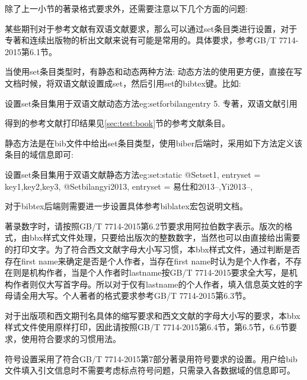 \documentclass[11pt]{article} %
\begin{document}
除了上一小节的著录格式要求外，还需要注意以下几个方面的问题:

\begin{property}{}{}
某些期刊对于参考文献有双语文献要求，那么可以通过set条目类进行设置，对于专著和连续出版物的析出文献来说有可能是常用的。具体要求，参考GB/T 7714-2015第6.1节。
\end{property}

当使用set条目类型时，有静态和动态两种方法:
动态方法的使用更方便，直接在写文档时候，将双语文献设置成set，然后引用set的bibtex键。比如:
\begin{codetex}{设置set条目集用于双语文献动态方法}{eg:setforbilangentry}
5. 专著，双语文献引用\cite{bilangyi2013}
\end{codetex}

得到的参考文献打印结果见\ref{sec:test:book}节的参考文献条目。

静态方法是在bib文件中给出set条目类型，使用biber后端时，采用如下方法定义该条目的域信息即可:
\begin{codetex}{设置set条目集用于双语文献静态方法}{eg:set:static}
@Set{set1,
entryset = {key1,key2,key3},
}
@Set{bilangyi2013,
entryset = {易仕和2013--,Yi2013--},
}
\end{codetex}
对于bibtex后端则需要进一步设置具体参考biblatex宏包说明文档。

\begin{property}{}{}
著录数字时，请按照GB/T 7714-2015第6.2节要求用阿拉伯数字表示。版次的格式，由bbx样式文件处理，只要给出版次的整数数字，当然也可以由直接给出需要的打印文字。为了符合西文文献字母大小写习惯，本bbx样式文件，通过判断是否存在first name来确定是否是个人作者，当存在first name时认为是个人作者，不存在则是机构作者，当是个人作者时lastname按GB/T 7714-2015要求全大写，是机构作者则仅大写首字母。所以对于仅有lastname的个人作者，填入信息英文姓的字母请全用大写。个人著者的格式要求参考GB/T 7714-2015第6.3节。
\end{property}

\begin{property}{}{}
对于出版项和西文期刊名具体的缩写要求和西文文献的字母大小写的要求，本bbx样式文件使用原样打印，因此请按照GB/T 7714-2015第6.4节，第6.5节，6.6节要求，使用符合要求的习惯用法。
\end{property}

\begin{property}{}{}
符号设置采用了符合GB/T 7714-2015第7部分著录用符号要求的设置。用户给bib文件填入引文信息时不需要考虑标点符号问题，只需录入各数据域的信息即可。
\end{property}
\end{document}
